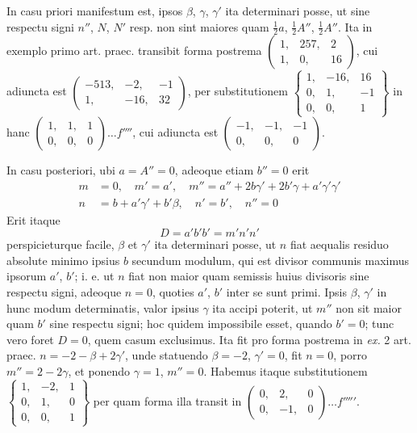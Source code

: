 In casu priori manifestum est, ipsos \(\beta\), \(\gamma\), \(\gamma'\) ita determinari posse, ut sine respectu signi \(n''\), \(N\), \(N'\) resp. non sint maiores quam \(\frac{1}{2}a\), \(\frac{1}{2}A''\), \(\frac{1}{2}A''\). Ita in exemplo primo art. praec. transibit forma postrema \(\left(\begin{smallmatrix}1,&257,&2\\1,&0,&16\end{smallmatrix}\right)\), cui adiuncta est \(\left(\begin{smallmatrix}-513,&-2,&-1\\1,&-16,&32\end{smallmatrix}\right)\), per substitutionem \(\left\{\begin{smallmatrix}1,&-16,&16\\0,&1,&-1\\0,&0,&1\end{smallmatrix}\right\}\) in hanc \(\left(\begin{smallmatrix}1,&1,&1\\0,&0,&0\end{smallmatrix}\right)\ldots f''''\), cui adiuncta est \(\left(\begin{smallmatrix}-1,&-1,&-1\\0,&0,&0\end{smallmatrix}\right)\).

In casu posteriori, ubi \(a=A''=0\), adeoque etiam \(b''=0\) erit
\[
\begin{aligned}
m&=0,\quad m'=a',\quad m''=a''+2b\gamma'+2b'\gamma+a'\gamma'\gamma'\\
n&=b+a'\gamma'+b'\beta,\quad n'=b',\quad n''=0
\end{aligned}
\]
Erit itaque
\[
D=a'b'b'=m'n'n'
\]
perspicieturque facile, \(\beta\) et \(\gamma'\) ita determinari posse, ut \(n\) fiat aequalis residuo absolute minimo ipsius \(b\) secundum modulum, qui est divisor communis maximus
ipsorum \(a'\), \(b'\); i. e. ut \(n\) fiat non maior quam semissis huius divisoris sine respectu signi, adeoque \(n=0\), quoties \(a'\), \(b'\) inter se sunt primi. Ipsis \(\beta\), \(\gamma'\) in hunc modum determinatis, valor ipsius \(\gamma\) ita accipi poterit, ut \(m''\) non sit maior quam \(b'\) sine respectu signi; hoc quidem impossibile esset, quando \(b'=0\); tunc vero foret \(D=0\), quem casum exclusimus. Ita fit pro forma postrema in \emph{ex.} 2 art. praec. \(n=-2-\beta+2\gamma'\), unde statuendo \(\beta=-2\), \(\gamma'=0\), fit \(n=0\), porro \(m''=2-2\gamma\), et ponendo \(\gamma=1\), \(m''=0\). Habemus itaque substitutionem \(\left\{\begin{smallmatrix}1,&-2,&1\\0,&1,&0\\0,&0,&1\end{smallmatrix}\right\}\) per quam forma illa transit in \(\left(\begin{smallmatrix}0,&2,&0\\0,&-1,&0\end{smallmatrix}\right)\ldots f'''''\).

